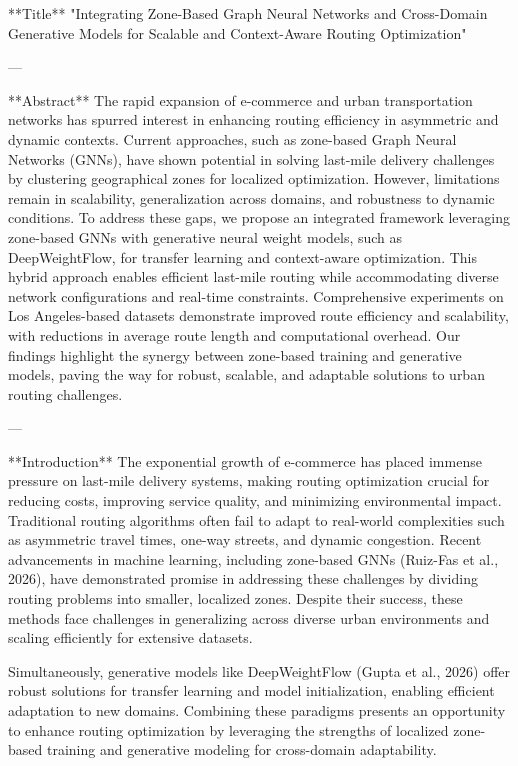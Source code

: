 **Title**  
"Integrating Zone-Based Graph Neural Networks and Cross-Domain Generative Models for Scalable and Context-Aware Routing Optimization"

---

**Abstract**  
The rapid expansion of e-commerce and urban transportation networks has spurred interest in enhancing routing efficiency in asymmetric and dynamic contexts. Current approaches, such as zone-based Graph Neural Networks (GNNs), have shown potential in solving last-mile delivery challenges by clustering geographical zones for localized optimization. However, limitations remain in scalability, generalization across domains, and robustness to dynamic conditions. To address these gaps, we propose an integrated framework leveraging zone-based GNNs with generative neural weight models, such as DeepWeightFlow, for transfer learning and context-aware optimization. This hybrid approach enables efficient last-mile routing while accommodating diverse network configurations and real-time constraints. Comprehensive experiments on Los Angeles-based datasets demonstrate improved route efficiency and scalability, with reductions in average route length and computational overhead. Our findings highlight the synergy between zone-based training and generative models, paving the way for robust, scalable, and adaptable solutions to urban routing challenges.

---

**Introduction**  
The exponential growth of e-commerce has placed immense pressure on last-mile delivery systems, making routing optimization crucial for reducing costs, improving service quality, and minimizing environmental impact. Traditional routing algorithms often fail to adapt to real-world complexities such as asymmetric travel times, one-way streets, and dynamic congestion. Recent advancements in machine learning, including zone-based GNNs (Ruiz-Fas et al., 2026), have demonstrated promise in addressing these challenges by dividing routing problems into smaller, localized zones. Despite their success, these methods face challenges in generalizing across diverse urban environments and scaling efficiently for extensive datasets.

Simultaneously, generative models like DeepWeightFlow (Gupta et al., 2026) offer robust solutions for transfer learning and model initialization, enabling efficient adaptation to new domains. Combining these paradigms presents an opportunity to enhance routing optimization by leveraging the strengths of localized zone-based training and generative modeling for cross-domain adaptability.

